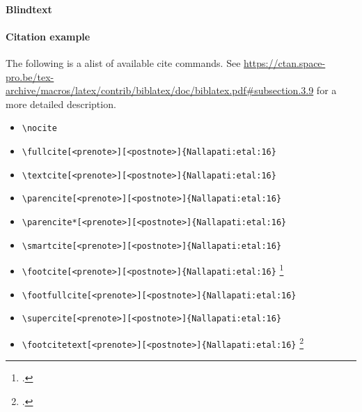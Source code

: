 \paragraph{Blindtext} 

\lipsum

\paragraph{Citation example}

The following is a alist of available cite commands. See \url{https://ctan.space-pro.be/tex-archive/macros/latex/contrib/biblatex/doc/biblatex.pdf#subsection.3.9} for a more detailed description.

\begin{itemize}
\item \verb=\nocite= \nocite{Bech:63}
\item \verb=\fullcite[<prenote>][<postnote>]{Nallapati:etal:16}= \newline  {}
\item \verb=\textcite[<prenote>][<postnote>]{Nallapati:etal:16}= \newline \textcite[<prenote>][<postnote>]{Nallapati:etal:16}
\item \verb=\parencite[<prenote>][<postnote>]{Nallapati:etal:16}= \newline \parencite[<prenote>][<postnote>]{Nallapati:etal:16}
\item \verb=\parencite*[<prenote>][<postnote>]{Nallapati:etal:16}= \newline \parencite*[<prenote>][<postnote>]{Nallapati:etal:16}
\item \verb=\smartcite[<prenote>][<postnote>]{Nallapati:etal:16}= \newline \smartcite[<prenote>][<postnote>]{Nallapati:etal:16}
\item \verb=\footcite[<prenote>][<postnote>]{Nallapati:etal:16}= \newline \footcite[<prenote>][<postnote>]{Nallapati:etal:16}
\item \verb=\footfullcite[<prenote>][<postnote>]{Nallapati:etal:16}= \newline  {}
\item \verb=\supercite[<prenote>][<postnote>]{Nallapati:etal:16}= \newline \supercite[<prenote>][<postnote>]{Nallapati:etal:16}
\item \verb=\footcitetext[<prenote>][<postnote>]{Nallapati:etal:16}= \newline \footcitetext[<prenote>][<postnote>]{Nallapati:etal:16}

\end{itemize}
